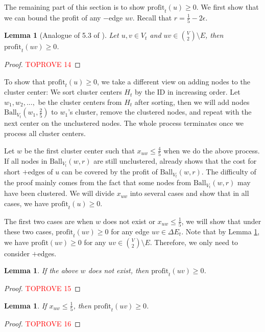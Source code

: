 \documentclass[11pt]{article}
\newtheorem{lemma}[theorem]{Lemma}
\newcommand{\ball}{\mathrm{Ball}}
\newcommand{\profit}{\mathrm{profit}}
\newcommand{\onefive}{\frac{1}{5}}
\newcommand{\twofive}{\frac{2}{5}}
\newcommand{\fourfive}{\frac{4}{5}}
\begin{document}
\begin{CJK*}{UTF8}{gbsn}
The remaining part of this section is to show $\profit_t(u) \geq 0$. We first show that we can bound the profit of any $-$edge $uv$. Recall that $r = \onefive - 2\epsilon$.

\begin{lemma}[Analogue of 5.3 of \cite{kalhan2019correlation}] 
\label{lem:roundingcostfornegativeedge}
 Let $u, v \in V_t$ and $uv \in {V \choose 2} \setminus E$, then $\profit_t(uv) \geq 0$.
\end{lemma}
\begin{proof}\textcolor{red}{TOPROVE 14}\end{proof}


To show that $\profit_t(u) \geq 0$, we take a different view on adding nodes to the cluster center: We sort cluster centers $H_t$ by the ID in increasing order. Let $w_1, w_2, ...,$ be the cluster centers from $H_t$ after sorting, then we will add nodes $\ball_{V_t}(w_1, \twofive)$ to $w_1$'s cluster, remove the clustered nodes, and repeat with the next center on the unclustered nodes. The whole process terminates once we process all cluster centers. 

Let $w$ be the first cluster center such that $x_{uw} \leq \fourfive$ when we do the above process. If all nodes in $\ball_{V_t}(w, r)$ are still unclustered, \cite{kalhan2019correlation} already shows that the cost for short $+$edges of $u$ can be covered by the profit of $\ball_{V_t}(w, r)$. The difficulty of the proof mainly comes from the fact that some nodes from  $\ball_{V_t}(w, r)$ may have been clustered. We will divide $x_{uw}$ into several cases and show that in all cases, we have $\profit_t(u) \geq 0$.

The first two cases are when $w$ does not exist or $x_{uw} \leq \onefive$, we will show that under these two cases, $\profit_t(uv) \geq 0$ for any edge $uv \in \Delta E_t$. Note that by Lemma \ref{lem:roundingcostfornegativeedge}, we have $\profit(uv) \geq 0$ for any $uv \in {V \choose 2} \setminus E$. Therefore, we only need to consider $+$edges.

\begin{lemma}
\label{lem:firstcaseprofit}
If the above $w$ does not exist, then $\profit_t(uv) \geq 0$.
\end{lemma}
\begin{proof}\textcolor{red}{TOPROVE 15}\end{proof}

\begin{lemma}
\label{lem:secondcaseprofit}
If $x_{uw} \leq \onefive$, then $\profit_t(uv) \geq 0$.
\end{lemma}
\begin{proof}\textcolor{red}{TOPROVE 16}\end{proof}


\end{CJK*}
\end{document}
